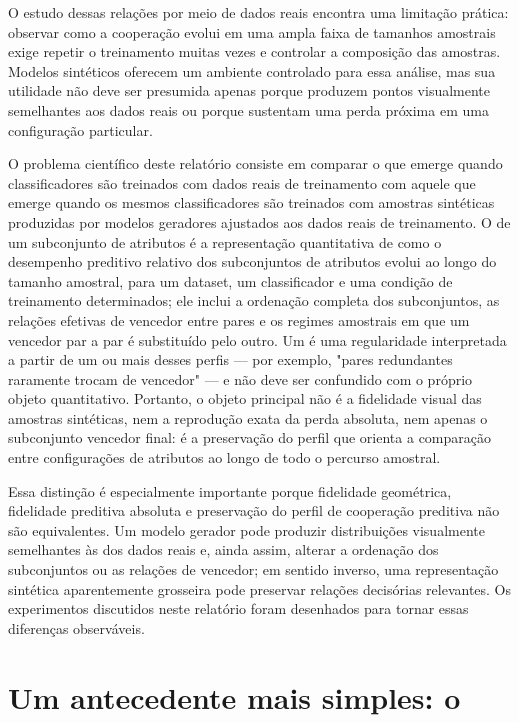 O estudo dessas relações por meio de dados reais encontra uma limitação prática: observar como a cooperação evolui em uma ampla faixa de tamanhos amostrais exige repetir o treinamento muitas vezes e controlar a composição das amostras. Modelos sintéticos oferecem um ambiente controlado para essa análise, mas sua utilidade não deve ser presumida apenas porque produzem pontos visualmente semelhantes aos dados reais ou porque sustentam uma perda próxima em uma configuração particular.

O problema científico deste relatório consiste em comparar o \PredictiveCooperationProfile{} que emerge quando classificadores são treinados com dados reais de treinamento com aquele que emerge quando os mesmos classificadores são treinados com amostras sintéticas produzidas por modelos geradores ajustados aos dados reais de treinamento. O \PredictiveCooperationProfile{} de um subconjunto de atributos é a representação quantitativa de como o desempenho preditivo relativo dos subconjuntos de atributos evolui ao longo do tamanho amostral, para um dataset, um classificador e uma condição de treinamento determinados; ele inclui a ordenação completa dos subconjuntos, as relações efetivas de vencedor entre pares e os regimes amostrais em que um vencedor par a par é substituído pelo outro. Um \PredictiveCooperationPattern{} é uma regularidade interpretada a partir de um ou mais desses perfis --- por exemplo, "pares redundantes raramente trocam de vencedor" --- e não deve ser confundido com o próprio objeto quantitativo. Portanto, o objeto principal não é a fidelidade visual das amostras sintéticas, nem a reprodução exata da perda absoluta, nem apenas o subconjunto vencedor final: é a preservação do perfil que orienta a comparação entre configurações de atributos ao longo de todo o percurso amostral.

Essa distinção é especialmente importante porque fidelidade geométrica, fidelidade preditiva absoluta e preservação do perfil de cooperação preditiva não são equivalentes. Um modelo gerador pode produzir distribuições visualmente semelhantes às dos dados reais e, ainda assim, alterar a ordenação dos subconjuntos ou as relações de vencedor; em sentido inverso, uma representação sintética aparentemente grosseira pode preservar relações decisórias relevantes. Os experimentos discutidos neste relatório foram desenhados para tornar essas diferenças observáveis.

\section{Um antecedente mais simples: o \SLACGS{}}

